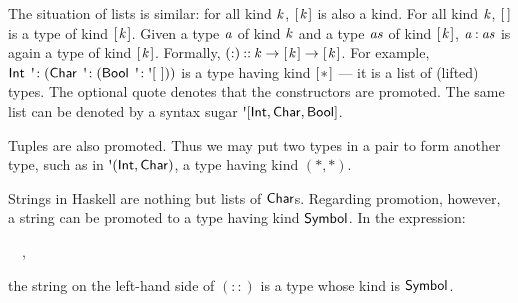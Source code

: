 The situation of lists is similar: for all kind \ensuremath{\Varid{k}}, \ensuremath{[\mskip1.5mu \Varid{k}\mskip1.5mu]} is also a kind. For
all kind \ensuremath{\Varid{k}}, \ensuremath{[\mskip1.5mu \mskip1.5mu]} is a type of kind \ensuremath{[\mskip1.5mu \Varid{k}\mskip1.5mu]}. Given a type \ensuremath{\Varid{a}} of kind \ensuremath{\Varid{k}} and a
type \ensuremath{\Varid{as}} of kind \ensuremath{[\mskip1.5mu \Varid{k}\mskip1.5mu]}, \ensuremath{\Varid{a}\mathbin{:}\Varid{as}} is again a type of kind \ensuremath{[\mskip1.5mu \Varid{k}\mskip1.5mu]}. Formally,
\ensuremath{(\mathbin{:})\mathbin{::}\Varid{k}\to [\mskip1.5mu \Varid{k}\mskip1.5mu]\to [\mskip1.5mu \Varid{k}\mskip1.5mu]}. For example, \ensuremath{\Conid{Int}\mathrel{\,\mbox{\textquotesingle}\!:}(\Conid{Char}\mathrel{\,\mbox{\textquotesingle}\!:}(\Conid{Bool}\mathrel{\,\mbox{\textquotesingle}\!:}\mbox{\textquotesingle}[~]))} is a
type having kind \ensuremath{[\mskip1.5mu \mathbin{*}\mskip1.5mu]} --- it is a list of (lifted) types. The optional quote
denotes that the constructors are promoted. The same list can be denoted by a
syntax sugar \ensuremath{\mbox{\textquotesingle}[\Conid{Int},\Conid{Char},\Conid{Bool}]}.

Tuples are also promoted. Thus we may put two types in a pair to form another
type, such as in \ensuremath{\mbox{\textquotesingle}(\Conid{Int},\Conid{Char})}, a type having kind \ensuremath{(\mathbin{*},\mathbin{*})}.

Strings in Haskell are nothing but lists of \ensuremath{\Conid{Char}}s. Regarding promotion,
however, a string can be promoted to a type having kind \ensuremath{\Conid{Symbol}}. In the expression:
\begin{hscode}\SaveRestoreHook
{}%
%
\>[B]{}\mathbin{::}~~,{}\<[E]%
\ColumnHook
\end{hscode}\resethooks
the string on the left-hand side of \ensuremath{(\mathbin{::})} is a type whose kind is \ensuremath{\Conid{Symbol}}.

